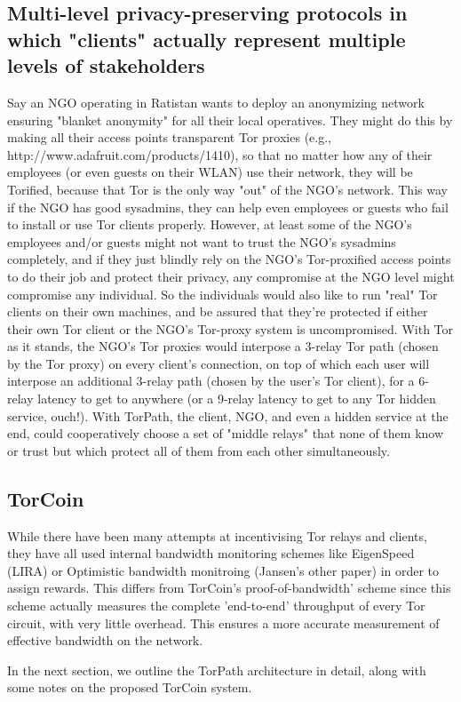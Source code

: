 \subsection{Multi-level privacy-preserving protocols in which "clients" actually represent multiple levels of stakeholders}
Say an NGO operating in Ratistan wants to deploy an anonymizing network ensuring "blanket anonymity" for all their local operatives.  They might do this by making all their access points transparent Tor proxies (e.g., http://www.adafruit.com/products/1410), so that no matter how any of their employees (or even guests on their WLAN) use their network, they will be Torified, because that Tor is the only way "out" of the NGO's network.  This way if the NGO has good sysadmins, they can help even employees or guests who fail to install or use Tor clients properly.  However, at least some of the NGO's employees and/or guests might not want to trust the NGO's sysadmins completely, and if they just blindly rely on the NGO's Tor-proxified access points to do their job and protect their privacy, any compromise at the NGO level might compromise any individual. So the individuals would also like to run "real" Tor clients on their own machines, and be assured that they're protected if either their own Tor client or the NGO's Tor-proxy system is uncompromised.  With Tor as it stands, the NGO's Tor proxies would interpose a 3-relay Tor path (chosen by the Tor proxy) on every client's connection, on top of which each user will interpose an additional 3-relay path (chosen by the user's Tor client), for a 6-relay latency to get to anywhere (or a 9-relay latency to get to any Tor hidden service, ouch!).  With TorPath, the client, NGO, and even a hidden service at the end, could cooperatively choose a set of "middle relays" that none of them know or trust but which protect all of them from each other simultaneously.

\subsection{TorCoin}
While there have been many attempts at incentivising Tor relays and clients, they have all used internal bandwidth monitoring schemes like EigenSpeed (LIRA) or Optimistic bandwidth monitroing (Jansen's other paper) in order to assign rewards. This differs from TorCoin's proof-of-bandwidth' scheme since this scheme actually measures the complete 'end-to-end' throughput of every Tor circuit, with very little overhead. This ensures a more accurate measurement of effective bandwidth on the network. 

In the next section, we outline the TorPath architecture in detail, along with some notes on the proposed TorCoin system.
